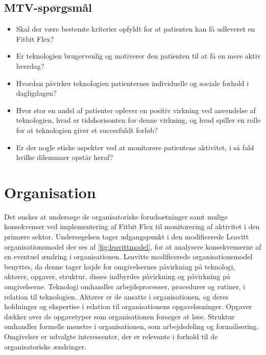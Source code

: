 \subsection{MTV-spørgsmål}
\begin{itemize}
\item Skal der være bestemte kriterier opfyldt for at patienten kan få udleveret en Fitbit Flex?
\item Er teknologien brugervenlig og motiverer den patienten til at få en mere aktiv hverdag?
\item Hvordan påvirker teknologien patienternes individuelle og sociale forhold i dagligdagen?
\item Hvor stor en andel af patienter oplever en positiv virkning ved anvendelse af teknologien, hvad er tidshorisonten for denne virkning, og hvad spiller en rolle for at teknologien giver et succesfuldt forløb?
\item Er der nogle etiske aspekter ved at monitorere patientens aktivitet, i så fald hvilke dilemmaer opstår heraf?
\end{itemize} 

\section{Organisation}\label{sec:metode_org}
Det ønskes at undersøge de organisatoriske forudsætninger samt mulige konsekvenser ved implementering af Fitbit Flex til monitorering af aktivitet i den primære sektor. Undersøgelsen tager udgangspunkt i den modificerede Leavitt organisationsmodel der ses af \autoref{fig:leavittmodel}, for at analysere konsekvenserne af en eventuel ændring i organisationen. Leavitts modificerede organisationsmodel benyttes, da denne tager højde for omgivelsernes påvirkning på teknologi, aktører, opgaver, struktur, disses indbyrdes påvirkning og påvirkning på omgivelserne. 
Teknologi omhandler arbejdsprocesser, procedurer og rutiner, i relation til teknologien.  
Aktører er de ansatte i organisationen, og deres holdninger og ekspertise i relation til organisationens opgaveløsninger. 
Opgaver dækker over de opgavetyper som organisationen forsøger at løse. 
Struktur omhandler formelle mønstre i organisationen, som arbejdsdeling og formalisering.  
Omgivelser er udvalgte interessenter, der er relevante i forhold til de organisatoriske ændringer. 

